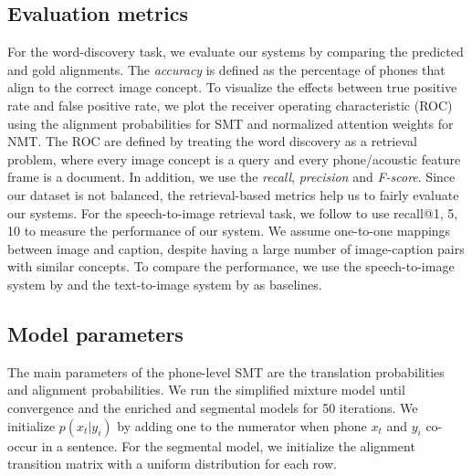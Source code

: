 \documentclass[journal]{IEEEtran}
\begin{document}
\subsection{Evaluation metrics}
For the word-discovery task, we evaluate our systems by comparing the predicted and gold alignments. The \textit{accuracy} is defined as the percentage of phones that align to the correct image concept. To visualize the effects between true positive rate and false positive rate, we plot the receiver operating characteristic (ROC) using the alignment probabilities for SMT and normalized attention weights for NMT. The ROC are defined by treating the word discovery as a retrieval problem, where every image concept is a query and every phone/acoustic feature frame is a document. In addition, we use the \textit{recall}, \textit{precision} and \textit{F-score}. Since our dataset is not balanced, the retrieval-based metrics help us to fairly evaluate our systems. For the speech-to-image retrieval task, we follow \cite{Harwath15, Karpathy15} to use recall@1, 5, 10 to measure the performance of our system. We assume one-to-one mappings between image and caption, despite having a large number of image-caption pairs with similar concepts. To compare the performance, we use the speech-to-image system by \cite{Harwath15} and the text-to-image system by \cite{Karpathy15} as baselines.    

\subsection{Model parameters}
The main parameters of the phone-level SMT are the translation probabilities and alignment probabilities. We run the simplified mixture model until convergence and the enriched and segmental models for 50 iterations. We initialize $p(x_t|y_i)$ by adding one to the numerator when phone $x_t$ and $y_i$ co-occur in a sentence. For the segmental model, we initialize the alignment transition matrix with a uniform distribution for each row. 
\end{document}
